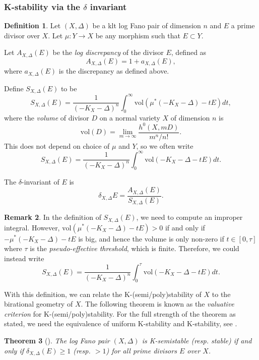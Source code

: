 \documentclass[11pt]{amsart}
\numberwithin{equation}{section}
\newtheorem{theorem}{Theorem}[section]
\theoremstyle{definition}
\newtheorem{definition}[theorem]{Definition}
\newtheorem{remark}[theorem]{Remark}
\newcommand{\vol}{\mathrm{vol}}
\begin{document}
\subsubsection{K-stability via the $\delta$ invariant}


\begin{definition}
Let $(X,\Delta)$ be a klt log Fano pair of dimension $n$ and $E$ a prime divisor over $X$.  Let $\mu: Y \to X$ be any morphism such that $E \subset Y$.

Let $A_{X,\Delta}(E)$ be the \textit{log discrepancy} of the divisor $E$, defined as \[ A_{X,\Delta}(E) = 1 + a_{X,\Delta}(E),\]
where $a_{X,\Delta}(E)$ is the discrepancy as defined above. 

Define $S_{X,\Delta}(E)$ to be 
\[ S_{X,\Delta}(E) = \frac{1}{(-K_X-\Delta)^n} \int_0^\infty \vol(\mu^*(-K_{X} -  \Delta) - tE) dt ,\] where the \textit{volume} of divisor $D$ on a normal variety $X$ of dimension $n$ is 
    \[ \vol(D) = \lim_{m\to \infty} \frac{h^0(X,mD)}{m^n/n!}.\] 
This does not depend on choice of $\mu$ and $Y$, so we often write \[ S_{X,\Delta}(E) = \frac{1}{(-K_X-\Delta)^n} \int_0^\infty \vol(-K_X - \Delta- tE) dt .\]

The $\delta$-invariant of $E$ is \[\delta_{X,\Delta}{E} = \frac{A_{X,\Delta}(E)}{S_{X,\Delta}(E)}. \]
\end{definition}


\begin{remark}
In the definition of $S_{X,\Delta}(E)$, we need to compute an improper integral.  However, $\vol(\mu^*(-K_X - \Delta) - tE) > 0$ if and only if $-\mu^*(-K_X - \Delta) - tE$ is big, and hence the volume is only non-zero if $t \in [0, \tau ]$ where $\tau$ is the \textit{pseudo-effective threshold}, which is finite. Therefore, we could instead write 
\[ S_{X,\Delta}(E) = \frac{1}{(-K_X- \Delta)^n} \int_0^\tau \vol(-K_X - \Delta- tE) dt .\]
\end{remark}


With this definition, we can relate the K-(semi/poly)stability of $X$ to the birational geometry of $X$.  The following theorem is known as the \textit{valuative criterion} for K-(semi/poly)stability. For the full strength of the theorem as stated, we need the equivalence of uniform K-stability and K-stability, see \cite{LXZ}.

\begin{theorem}[\cite{FuValuative,LiValuative}]\label{thm:valcriteria}
The log Fano pair $(X, \Delta)$ is K-semistable (resp. stable) if and only if $\delta_{X,\Delta}(E) \ge 1$ (resp. $> 1$) for all prime divisors $E$ over $X$.
\end{theorem}
\end{document}
